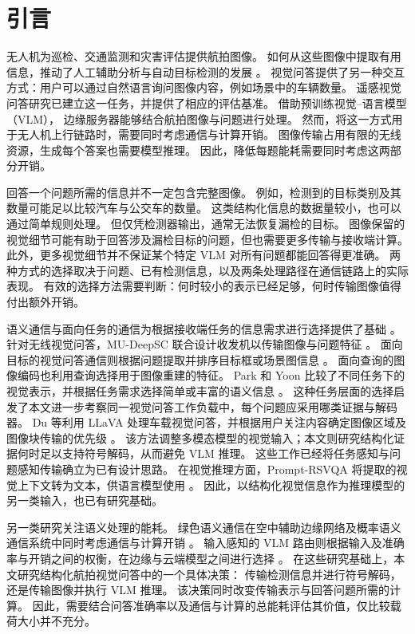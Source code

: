 \section{引言}\label{sec:intro}

无人机为巡检、交通监测和灾害评估提供航拍图像。
如何从这些图像中提取有用信息，推动了人工辅助分析与自动目标检测的发展
\cite{ofli2016combining,pi2020convolutional}。
视觉问答提供了另一种交互方式：用户可以通过自然语言询问图像内容，例如场景中的车辆数量。
遥感视觉问答研究已建立这一任务，并提供了相应的评估基准\cite{lobry2020rsvqa}。
借助预训练视觉--语言模型（VLM）\cite{wang2024qwen2vl}，
边缘服务器能够结合航拍图像与问题进行处理。
然而，将这一方式用于无人机上行链路时，需要同时考虑通信与计算开销。
图像传输占用有限的无线资源，生成每个答案也需要模型推理。
因此，降低每题能耗需要同时考虑这两部分开销。

回答一个问题所需的信息并不一定包含完整图像。
例如，检测到的目标类别及其数量可能足以比较汽车与公交车的数量。
这类结构化信息的数据量较小，也可以通过简单规则处理。
但仅凭检测器输出，通常无法恢复漏检的目标。
图像保留的视觉细节可能有助于回答涉及漏检目标的问题，但也需要更多传输与接收端计算。
此外，更多视觉细节并不保证某个特定 VLM 对所有问题都能回答得更准确。
两种方式的选择取决于问题、已有检测信息，以及两条处理路径在通信链路上的实际表现。
有效的选择方法需要判断：何时较小的表示已经足够，何时传输图像值得付出额外开销。

语义通信与面向任务的通信为根据接收端任务的信息需求进行选择提供了基础
\cite{gunduz2023beyond,strinati2021sixg,kountouris2021semantics}。
针对无线视觉问答，MU-DeepSC 联合设计收发机以传输图像与问题特征
\cite{xie2022mudeepscwcl}。
面向目标的视觉问答通信则根据问题提取并排序目标框或场景图信息
\cite{liu2024gosg}。
面向查询的图像编码也利用查询选择用于图像重建的特征\cite{huang2026query}。
Park 和 Yoon 比较了不同任务下的视觉表示，并根据任务需求选择简单或丰富的语义信息
\cite{park2025transmit}。
这种任务层面的选择启发了本文进一步考察同一视觉问答工作负载中，每个问题应采用哪类证据与解码器。
Du 等利用 LLaVA 处理车载视觉问答，并根据用户关注内容确定图像区域及图像块传输的优先级
\cite{jiang2025lmmvn}。
该方法调整多模态模型的视觉输入；本文则研究结构化证据何时足以支持符号解码，从而避免 VLM 推理。
这些工作已经将任务感知与问题感知传输确立为已有设计思路。
在视觉推理方面，Prompt-RSVQA 将提取的视觉上下文转为文本，供语言模型使用
\cite{chappuis2022promptrsvqa}。
因此，以结构化视觉信息作为推理模型的另一类输入，也已有研究基础。

另一类研究关注语义处理的能耗。
绿色语义通信在空中辅助边缘网络及概率语义通信系统中同时考虑通信与计算开销
\cite{zheng2024aerialee,dai2025pscom}。
输入感知的 VLM 路由则根据输入及准确率与开销之间的权衡，在边缘与云端模型之间进行选择
\cite{sabanovic2026inarvl}。
在这些研究基础上，本文研究结构化航拍视觉问答中的一个具体决策：
传输检测信息并进行符号解码，还是传输图像并执行 VLM 推理。
该决策同时改变传输表示与回答问题所需的计算。
因此，需要结合问答准确率以及通信与计算的总能耗评估其价值，仅比较载荷大小并不充分。

